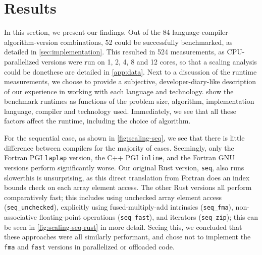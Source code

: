 \documentclass[british]{scrreprt}
\begin{document}
\section{Results}
\label{sec:results}
In this section, we present our findings. Out of the 84 language-compiler-algorithm-version combinations, 52 could be successfully benchmarked, as detailed in \cref{sec:implementation}. This resulted in 524 measurements, as CPU-parallelized versions were run on 1, 2, 4, 8 and 12 cores, so that a scaling analysis could be done\textemdash{}these are detailed in \cref{app:data}. Next to a discussion of the runtime measurements, we choose to provide a subjective, developer-diary-like description of our experience in working with each language and technology.  show the benchmark runtimes as functions of the problem size, algorithm, implementation language, compiler and technology used. Immediately, we see that all these factors affect the runtime, including the choice of algorithm.

For the sequential case, as shown in \cref{fig:scaling-seq}, we see that there is little difference between compilers for the majority of cases. Seemingly, only the Fortran PGI \texttt{laplap} version, the C++ PGI \texttt{inline}, and the Fortran GNU versions perform significantly worse. Our original Rust version, \texttt{seq}, also runs slower\textemdash{}this is unsurprising, as this direct translation from Fortran does an index bounds check on each array element access. The other Rust versions all perform comparatively fast; this includes using unchecked array element access (\texttt{seq\_unchecked}), explicitly using fused-multiply-add intrinsics (\texttt{seq\_fma}), non-associative floating-point operations (\texttt{seq\_fast}), and iterators (\texttt{seq\_zip}); this can be seen in \cref{fig:scaling-seq-rust} in more detail. Seeing this, we concluded that these approaches were all similarly performant, and chose not to implement the \texttt{fma} and \texttt{fast} versions in parallelized or offloaded code.
\end{document}
